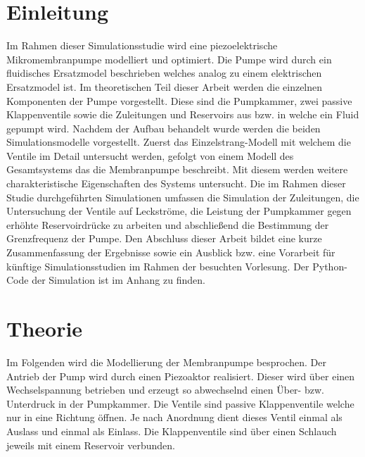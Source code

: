 \documentclass[fontsize=12pt, a4paper]{scrartcl}
\begin{document}
\tableofcontents            %


\newpage

\section{Einleitung}
Im Rahmen dieser Simulationsstudie wird eine piezoelektrische Mikromembranpumpe modelliert und optimiert. Die Pumpe wird durch ein fluidisches Ersatzmodel beschrieben welches analog zu einem elektrischen Ersatzmodel ist. Im theoretischen Teil dieser Arbeit werden die einzelnen Komponenten der Pumpe vorgestellt. Diese sind die Pumpkammer, zwei passive Klappenventile sowie die Zuleitungen und Reservoirs aus bzw. in welche ein Fluid gepumpt wird. Nachdem der Aufbau behandelt wurde werden die beiden Simulationsmodelle vorgestellt. Zuerst das Einzelstrang-Modell mit welchem die Ventile im Detail untersucht werden, gefolgt von einem Modell des Gesamtsystems das die Membranpumpe beschreibt. Mit diesem werden weitere charakteristische Eigenschaften des Systems untersucht. Die im Rahmen dieser Studie durchgeführten Simulationen umfassen die Simulation der Zuleitungen, die Untersuchung der Ventile auf Leckströme, die Leistung der Pumpkammer gegen erhöhte Reservoirdrücke zu arbeiten und abschließend die Bestimmung der Grenzfrequenz der Pumpe. Den Abschluss dieser Arbeit bildet eine kurze Zusammenfassung der Ergebnisse sowie ein Ausblick bzw. eine Vorarbeit für künftige Simulationsstudien im Rahmen der besuchten Vorlesung. Der Python-Code der Simulation ist im Anhang zu finden.

\section{Theorie}

Im Folgenden wird die Modellierung der Membranpumpe besprochen. Der Antrieb der Pump wird durch einen Piezoaktor realisiert. Dieser wird über einen Wechselspannung betrieben und erzeugt so abwechselnd einen Über- bzw. Unterdruck in der Pumpkammer. Die Ventile sind passive Klappenventile welche nur in eine Richtung öffnen. Je nach Anordnung dient dieses Ventil einmal als Auslass und einmal als Einlass. Die Klappenventile sind über einen Schlauch jeweils mit einem Reservoir verbunden.
\end{document}
